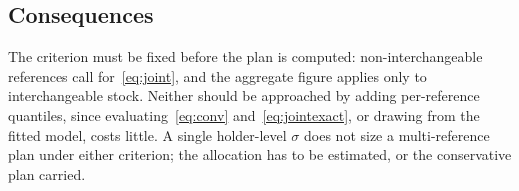 \subsection{Consequences}
The criterion must be fixed before the plan is computed: non-interchangeable
references call for~\eqref{eq:joint}, and the aggregate figure applies only to
interchangeable stock. Neither should be approached by adding per-reference
quantiles, since evaluating~\eqref{eq:conv} and~\eqref{eq:jointexact}, or
drawing from the fitted model, costs little. A single holder-level $\sigma$
does not size a multi-reference plan under either criterion; the allocation
has to be estimated, or the conservative plan carried.
